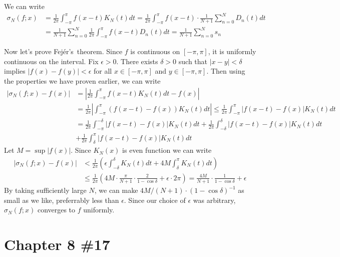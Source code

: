 \documentclass{scrartcl}
\begin{document}
We can write
\begin{align*}
  \sigma_N(f; x)
  &= \frac{1}{2\pi} \int^\pi_{-\pi} f(x - t) K_N(t) dt
  = \frac{1}{2\pi} \int^\pi_{-\pi} f(x - t)
    \cdot \frac{1}{N + 1} \sum^N_{n = 0} D_n(t) dt \\
  &= \frac{1}{N + 1}
    \sum^N_{n = 0} \frac{1}{2\pi} \int^\pi_{-\pi} f(x - t) D_n(t) dt
  = \frac{1}{N + 1} \sum^N_{n = 0} s_n
\end{align*}

Now let's prove Fejér's~theorem. Since \(f\) is continuous on \([-\pi, \pi]\),
it is uniformly continuous on the interval. Fix \(\epsilon > 0\). There exists
\(\delta > 0\) such that \(|x - y| < \delta\) implies \(|f(x) - f(y)| <
\epsilon\) for all \(x \in [-\pi, \pi]\) and \(y \in [-\pi, \pi]\). Then using
the properties we have proven earlier, we can write
\begin{align*}
  |\sigma_N(f; x) - f(x)|
  &= \left| \frac{1}{2\pi} \int^\pi_{-\pi} f(x - t) K_N(t) dt - f(x) \right| \\
  &= \frac{1}{2\pi} \left| \int^\pi_{-\pi} (f(x - t) - f(x)) K_N(t) dt \right|
  \le \frac{1}{2\pi} \int^\pi_{-\pi} |f(x - t) - f(x)| K_N(t) dt \\
  &= \frac{1}{2\pi} \int^{-\delta}_{-\pi} |f(x - t) - f(x)| K_N(t) dt
    + \frac{1}{2\pi} \int^\delta_{-\delta} |f(x - t) - f(x)| K_N(t) dt \\
  &+ \frac{1}{2\pi} \int^\pi_{\delta} |f(x - t) - f(x)| K_N(t) dt
\end{align*}
Let \(M = \sup |f(x)|\). Since \(K_N(x)\) is even function we can write
\begin{align*}
  |\sigma_N(f; x) - f(x)|
  &< \frac{1}{2\pi} \left( \epsilon \int^\delta_{-\delta} K_N(t) dt
    + 4M \int^\pi_\delta K_N(t) dt \right) \\
  &\le \frac{1}{2\pi} \left(
    4M \cdot \frac{\pi}{N + 1} \cdot \frac{2}{1 - \cos \delta}
    + \epsilon \cdot 2\pi
  \right)
  = \frac{4M}{N + 1} \cdot \frac{1}{1 - \cos \delta} + \epsilon
\end{align*}
By taking sufficiently large \(N\), we can make \(4M / (N + 1) \cdot (1 - \cos
\delta)^{-1}\) as small as we like, preferrably less than \(\epsilon\). Since
our choice of \(\epsilon\) was arbitrary, \(\sigma_N(f; x)\) converges to \(f\)
uniformly.

\section{Chapter 8 \#17}
\end{document}
